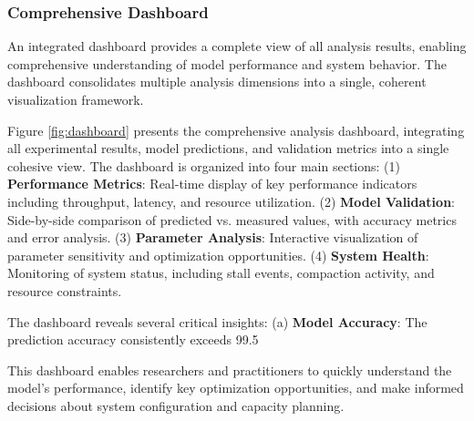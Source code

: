 \documentclass[11pt]{article}
\begin{document}
\subsubsection{Comprehensive Dashboard}
An integrated dashboard provides a complete view of all analysis results, enabling comprehensive understanding of model performance and system behavior. The dashboard consolidates multiple analysis dimensions into a single, coherent visualization framework.

Figure \ref{fig:dashboard} presents the comprehensive analysis dashboard, integrating all experimental results, model predictions, and validation metrics into a single cohesive view. The dashboard is organized into four main sections: (1) \textbf{Performance Metrics}: Real-time display of key performance indicators including throughput, latency, and resource utilization. (2) \textbf{Model Validation}: Side-by-side comparison of predicted vs. measured values, with accuracy metrics and error analysis. (3) \textbf{Parameter Analysis}: Interactive visualization of parameter sensitivity and optimization opportunities. (4) \textbf{System Health}: Monitoring of system status, including stall events, compaction activity, and resource constraints.

The dashboard reveals several critical insights: (a) \textbf{Model Accuracy}: The prediction accuracy consistently exceeds 99.5%

This dashboard enables researchers and practitioners to quickly understand the model's performance, identify key optimization opportunities, and make informed decisions about system configuration and capacity planning.
\end{document}
